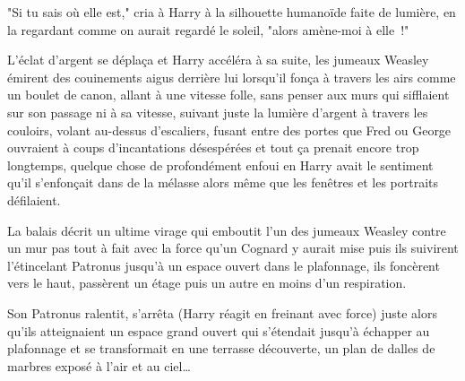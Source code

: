 "Si tu sais où elle est," cria à Harry à la silhouette humanoïde faite de lumière, en la regardant comme on aurait regardé le soleil, "alors amène-moi à elle~!"

L'éclat d'argent se déplaça et Harry accéléra à sa suite, les jumeaux Weasley émirent des couinements aigus derrière lui lorsqu'il fonça à travers les airs comme un boulet de canon, allant à une vitesse folle, sans penser aux murs qui sifflaient sur son passage ni à sa vitesse, suivant juste la lumière d'argent à travers les couloirs, volant au-dessus d'escaliers, fusant entre des portes que Fred ou George ouvraient à coups d'incantations désespérées et tout ça prenait encore trop longtemps, quelque chose de profondément enfoui en Harry avait le sentiment qu'il s'enfonçait dans de la mélasse alors même que les fenêtres et les portraits défilaient.

La balais décrit un ultime virage qui emboutit l'un des jumeaux Weasley contre un mur pas tout à fait avec la force qu'un Cognard y aurait mise puis ils suivirent l'étincelant Patronus jusqu'à un espace ouvert dans le plafonnage, ils foncèrent vers le haut, passèrent un étage puis un autre en moins d'un respiration.

Son Patronus ralentit, s'arrêta (Harry réagit en freinant avec force) juste alors qu'ils atteignaient un espace grand ouvert qui s'étendait jusqu'à échapper au plafonnage et se transformait en une terrasse découverte, un plan de dalles de marbres exposé à l'air et au ciel… 

